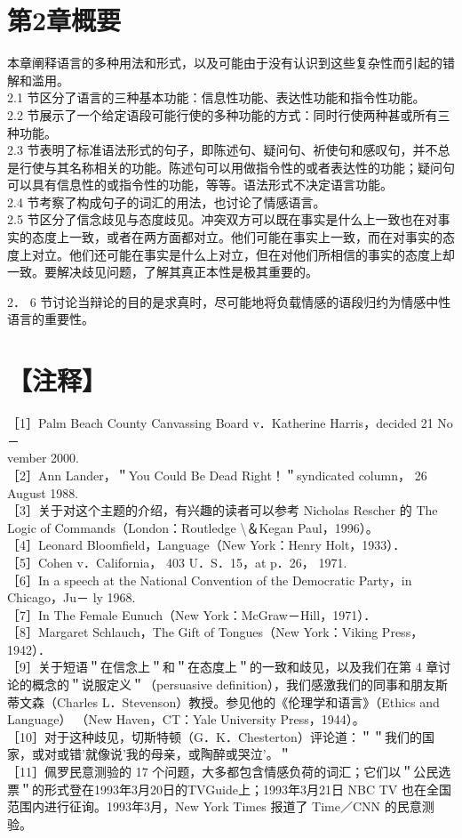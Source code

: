 \section*{第2章概要}
本章阐释语言的多种用法和形式，以及可能由于没有认识到这些复杂性而引起的错解和滥用。\\
2.1 节区分了语言的三种基本功能：信息性功能、表达性功能和指令性功能。\\
2.2 节展示了一个给定语段可能行使的多种功能的方式：同时行使两种甚或所有三种功能。\\
2.3 节表明了标准语法形式的句子，即陈述句、疑问句、祈使句和感叹句，并不总是行使与其名称相关的功能。陈述句可以用做指令性的或者表达性的功能；疑问句可以具有信息性的或指令性的功能，等等。语法形式不决定语言功能。\\
2.4 节考察了构成句子的词汇的用法，也讨论了情感语言。\\
2.5 节区分了信念歧见与态度歧见。冲突双方可以既在事实是什么上一致也在对事实的态度上一致，或者在两方面都对立。他们可能在事实上一致，而在对事实的态度上对立。他们还可能在事实是什么上对立，但在对他们所相信的事实的态度上却一致。要解决歧见问题，了解其真正本性是极其重要的。

2． 6 节讨论当辩论的目的是求真时，尽可能地将负载情感的语段归约为情感中性语言的重要性。

\section*{【注释】}
［1］Palm Beach County Canvassing Board v．Katherine Harris，decided 21 No－\\
vember 2000.\\
［2］Ann Lander，＂You Could Be Dead Right！＂syndicated column， 26 August 1988.\\
［3］关于对这个主题的介绍，有兴趣的读者可以参考 Nicholas Rescher 的 The Logic of Commands（London：Routledge \textbackslash ＆Kegan Paul，1996）。\\
［4］Leonard Bloomfield，Language（New York：Henry Holt，1933）．\\
［5］Cohen v．California， 403 U．S．15，at p．26， 1971.\\
［6］In a speech at the National Convention of the Democratic Party，in Chicago，Ju－ ly 1968.\\
［7］In The Female Eunuch（New York：McGraw－Hill，1971）．\\
［8］Margaret Schlauch，The Gift of Tongues（New York：Viking Press，1942）．\\
［9］关于短语＂在信念上＂和＂在态度上＂的一致和歧见，以及我们在第 4 章讨论的概念的＂说服定义＂（persuasive definition），我们感激我们的同事和朋友斯蒂文森（Charles L．Stevenson）教授。参见他的《伦理学和语言》（Ethics and Language） （New Haven，CT：Yale University Press，1944）。\\
［10］对于这种歧见，切斯特顿（G．K．Chesterton）评论道：＂＂我们的国家，或对或错'就像说'我的母亲，或陶醉或哭泣'。＂\\
［11］佩罗民意测验的 17 个问题，大多都包含情感负荷的词汇；它们以＂公民选票＂的形式登在1993年3月20日的TVGuide上；1993年3月21日 NBC TV 也在全国范围内进行征询。1993年3月，New York Times 报道了 Time／CNN 的民意测验。 